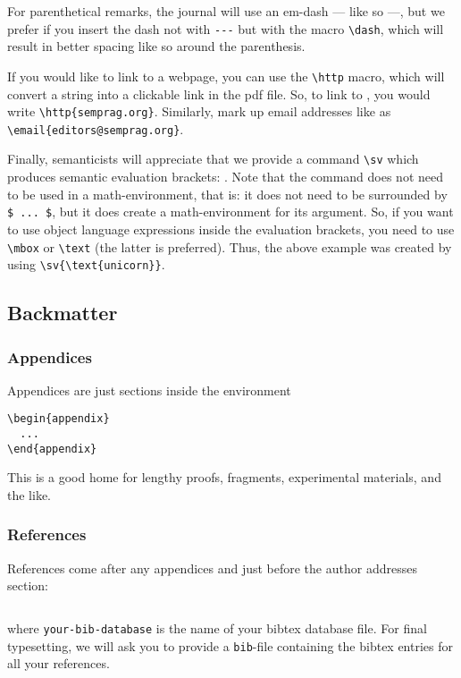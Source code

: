 \documentclass[lucida,final]{sp}
\newcommand{\spfile}[1]{\texttt{#1}}
\newcommand{\spcode}[1]{\texttt{#1}}
\begin{document}
For parenthetical remarks, the journal will use an em-dash --- like so
---, but we prefer if you insert the dash not with \verb?---? but with
the macro \verb?\dash?, which will result in better spacing \dash like
so \dash around the parenthesis.

If you would like to link to a webpage, you can use the \verb?\http?
macro, which will convert a string into a clickable link in the pdf
file. So, to link to , you would write
\verb?\http{semprag.org}?. Similarly, mark up email addresses like
 as \verb?\email{editors@semprag.org}?.

Finally, semanticists will appreciate that we provide a command
\verb?\sv? which produces semantic evaluation brackets:
. Note that the command does not need to be used in
a math-environment, that is: it does not need to be surrounded by
\verb?$ ... $?, but it does create a math-environment for its
argument. So, if you want to use object language expressions inside
the evaluation brackets, you need to use \verb?\mbox? or \verb?\text?
(the latter is preferred). Thus, the above example was created by
using \verb?\sv{\text{unicorn}}?.


\subsection{Backmatter}

\subsubsection{Appendices}

Appendices are just sections inside the environment
%
\begin{Verbatim}
\begin{appendix}
  ...
\end{appendix}
\end{Verbatim}
%
This is a good home for lengthy proofs, fragments, experimental
materials, and the like.


\subsubsection{References}\label{sec:refs}

References come after any appendices and just before the author
addresses section:
%
\begin{Verbatim}

\end{Verbatim}
%
where \spcode{your-bib-database} is the name of your bibtex database
file. For final typesetting, we will ask you to provide a
\spfile{bib}-file containing the bibtex entries for all your
references.
\end{document}
